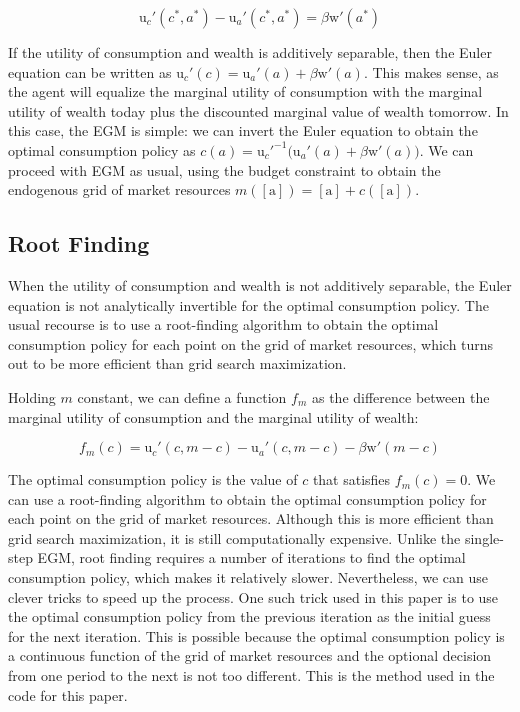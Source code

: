 \documentclass{article}
\newcommand{\DiscFac}{\beta}
\newcommand{\uFunc}{\mathrm{u}}
\newcommand{\aNrm}{a}
\newcommand{\cNrm}{c}
\newcommand{\mNrm}{m}
\newcommand{\wFunc}{\mathrm{w}}
\newcommand{\aMat}{[\mathrm{a}]}
\begin{document}
\begin{equation}
\uFunc_{c}'(\cNrm^*, \aNrm^*) - \uFunc_{a}'(\cNrm^*, \aNrm^*) = \DiscFac \wFunc'(\aNrm^*)
\end{equation}

If the utility of consumption and wealth is additively separable, then the Euler equation can be written as $\uFunc_{c}'(\cNrm) = \uFunc_{a}'(\aNrm) + \DiscFac \wFunc'(\aNrm)$. This makes sense, as the agent will equalize the marginal utility of consumption with the marginal utility of wealth today plus the discounted marginal value of wealth tomorrow. In this case, the EGM is simple: we can invert the Euler equation to obtain the optimal consumption policy as $\cNrm(\aNrm) = \uFunc_{c}'^{ -1}\big(\uFunc_{a}'(\aNrm) + \DiscFac \wFunc'(\aNrm)\big)$. We can proceed with EGM as usual, using the budget constraint to obtain the endogenous grid of market resources $\mNrm(\aMat) = \aMat + \cNrm(\aMat)$.

\subsection{Root Finding}\label{Root Finding}

When the utility of consumption and wealth is not additively separable, the Euler equation is not analytically invertible for the optimal consumption policy. The usual recourse is to use a root-finding algorithm to obtain the optimal consumption policy for each point on the grid of market resources, which turns out to be more efficient than grid search maximization.

Holding $\mNrm$ constant, we can define a function $f_{m}$ as the difference between the marginal utility of consumption and the marginal utility of wealth:

\begin{equation}
f_{m}(\cNrm) = \uFunc_{c}'(\cNrm, \mNrm - \cNrm) - \uFunc_{a}'(\cNrm, \mNrm - \cNrm) - \DiscFac \wFunc'(\mNrm - \cNrm)
\end{equation}

The optimal consumption policy is the value of $\cNrm$ that satisfies $f_{m}(\cNrm) = 0$. We can use a root-finding algorithm to obtain the optimal consumption policy for each point on the grid of market resources. Although this is more efficient than grid search maximization, it is still computationally expensive. Unlike the single-step EGM, root finding requires a number of iterations to find the optimal consumption policy, which makes it relatively slower. Nevertheless, we can use clever tricks to speed up the process. One such trick used in this paper is to use the optimal consumption policy from the previous iteration as the initial guess for the next iteration. This is possible because the optimal consumption policy is a continuous function of the grid of market resources and the optional decision from one period to the next is not too different. This is the method used in the code for this paper.
\end{document}
